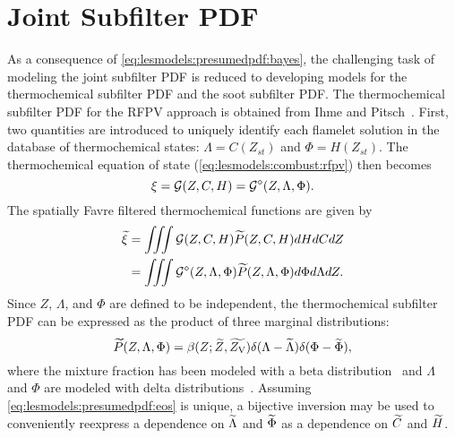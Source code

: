 \section{Joint Subfilter PDF}
\label{sec:subfilter:joint}

As a consequence of \cref{eq:lesmodels:presumedpdf:bayes}, the challenging task of modeling the joint subfilter PDF is reduced to developing models for the thermochemical subfilter PDF and the soot subfilter PDF. The thermochemical subfilter PDF for the RFPV approach is obtained from Ihme and Pitsch~\cite{ihme2008}. First, two quantities are introduced to uniquely identify each flamelet solution in the database of thermochemical states: $\Lambda = C(Z_{st})$ and $\Phi = H(Z_{st})$. The thermochemical equation of state (\cref{eq:lesmodels:combust:rfpv}) then becomes
\begin{equation}\label{eq:lesmodels:presumedpdf:eos}
  \xi = \mathcal{G}(Z, C, H) = \mathcal{G}^{\diamond}(Z, \Lambda, \Phi).
\end{equation}
The spatially Favre filtered thermochemical functions are given by
\begin{equation}\label{eq:lesmodels:presumedpdf:filteredeos}
  \begin{split}
    \widetilde{\xi} &= \iiint \mathcal{G}(Z,C,H)\widetilde{P}(Z,C,H) dHdCdZ \\
    &= \iiint \mathcal{G}^{\diamond}(Z,\Lambda,\Phi)\widetilde{P}(Z,\Lambda,\Phi) d\Phi d\Lambda dZ.
  \end{split}
\end{equation}
Since $Z$, $\Lambda$, and $\Phi$ are defined to be independent, the thermochemical subfilter PDF can be expressed as the product of three marginal distributions:
\begin{equation}\label{eq:lesmodels:presumedpdf:trimarg}
  \widetilde{P}(Z,\Lambda,\Phi) = \beta(Z;\widetilde{Z},\widetilde{Z_{\text{V}}})\delta(\Lambda - \widetilde{\Lambda})\delta(\Phi - \widetilde{\Phi}),
\end{equation}
where the mixture fraction has been modeled with a beta distribution~\cite{cook1994,jimenez1997,wall2000} and $\Lambda$ and $\Phi$ are modeled with delta distributions~\cite{ihme2008}. Assuming \cref{eq:lesmodels:presumedpdf:eos} is unique, a bijective inversion may be used to conveniently reexpress a dependence on $\widetilde{\Lambda}$ and $\widetilde{\Phi}$ as a dependence on $\widetilde{C}$ and $\widetilde{H}$.

